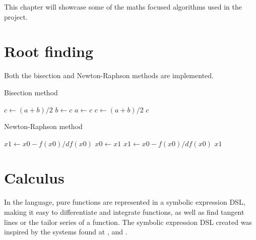 This chapter will showcase some of the maths focused algorithms used in the project.

\section{Root finding}\label{sec:root-finding}

Both the bisection and Newton-Raphson methods are implemented.

\begin{algorithm}
    \caption{Bisection method}
    \begin{algorithmic}
            \State $c \gets (a + b) / 2$
                    \State $b \gets c$
                \Else
                    \State $a \gets c$
                \EndIf
                \State $c \gets (a + b) / 2$
            \EndWhile
            \State \Return $c$
        \EndFunction
    \end{algorithmic}\label{alg:algorithm2}
\end{algorithm}

\begin{algorithm}
    \caption{Newton-Raphson method}
    \begin{algorithmic}
            \State $x1 \gets x0 - f(x0) / df(x0)$
                \State $x0 \gets x1$
                \State $x1 \gets x0 - f(x0) / df(x0)$
            \EndWhile
            \State \Return $x1$
        \EndFunction
    \end{algorithmic}\label{alg:algorithm3}
\end{algorithm}

\section{Calculus}\label{sec:integration}
In the language, pure functions are represented in a symbolic expression DSL, making it easy to differentiate and 
integrate functions, as well as find tangent lines or the tailor series of a function.
The symbolic expression DSL created was inspired by the systems found at \citet{symbolicExprHask}, 
\citet{symbolicExprPython} and \citet{symbolicExprF}.

